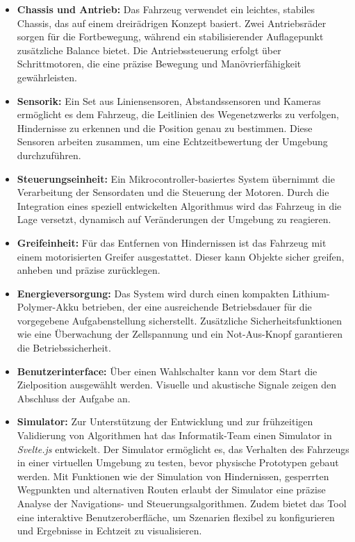 \documentclass[main.tex]{subfiles} %
\begin{document}
\begin{itemize}
    \item \textbf{Chassis und Antrieb:} Das Fahrzeug verwendet ein leichtes, stabiles Chassis, das auf einem dreirädrigen Konzept basiert. Zwei Antriebsräder sorgen für die Fortbewegung, während ein stabilisierender Auflagepunkt zusätzliche Balance bietet. Die Antriebssteuerung erfolgt über Schrittmotoren, die eine präzise Bewegung und Manövrierfähigkeit gewährleisten.

    \item \textbf{Sensorik:} Ein Set aus Liniensensoren, Abstandssensoren und Kameras ermöglicht es dem Fahrzeug, die Leitlinien des Wegenetzwerks zu verfolgen, Hindernisse zu erkennen und die Position genau zu bestimmen. Diese Sensoren arbeiten zusammen, um eine Echtzeitbewertung der Umgebung durchzuführen.

    \item \textbf{Steuerungseinheit:} Ein Mikrocontroller-basiertes System übernimmt die Verarbeitung der Sensordaten und die Steuerung der Motoren. Durch die Integration eines speziell entwickelten Algorithmus wird das Fahrzeug in die Lage versetzt, dynamisch auf Veränderungen der Umgebung zu reagieren.

    \item \textbf{Greifeinheit:} Für das Entfernen von Hindernissen ist das Fahrzeug mit einem motorisierten Greifer ausgestattet. Dieser kann Objekte sicher greifen, anheben und präzise zurücklegen.

    \item \textbf{Energieversorgung:} Das System wird durch einen kompakten Lithium-Polymer-Akku betrieben, der eine ausreichende Betriebsdauer für die vorgegebene Aufgabenstellung sicherstellt. Zusätzliche Sicherheitsfunktionen wie eine Überwachung der Zellspannung und ein Not-Aus-Knopf garantieren die Betriebssicherheit.

    \item \textbf{Benutzerinterface:} Über einen Wahlschalter kann vor dem Start die Zielposition ausgewählt werden. Visuelle und akustische Signale zeigen den Abschluss der Aufgabe an.

    \item \textbf{Simulator:} Zur Unterstützung der Entwicklung und zur frühzeitigen Validierung von Algorithmen hat das Informatik-Team einen Simulator in \textit{Svelte.js} entwickelt. Der Simulator ermöglicht es, das Verhalten des Fahrzeugs in einer virtuellen Umgebung zu testen, bevor physische Prototypen gebaut werden. Mit Funktionen wie der Simulation von Hindernissen, gesperrten Wegpunkten und alternativen Routen erlaubt der Simulator eine präzise Analyse der Navigations- und Steuerungsalgorithmen. Zudem bietet das Tool eine interaktive Benutzeroberfläche, um Szenarien flexibel zu konfigurieren und Ergebnisse in Echtzeit zu visualisieren.
\end{itemize}
\end{document}
